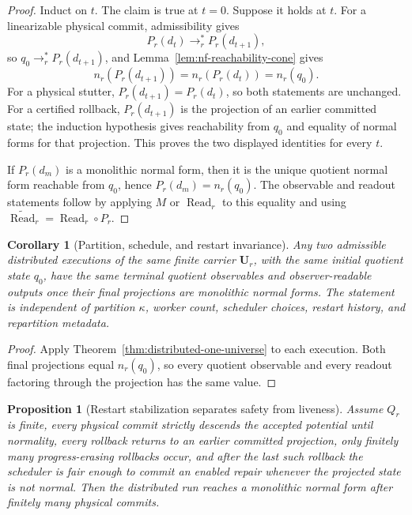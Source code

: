 \documentclass[11pt]{article}
\newtheorem{corollary}[theorem]{Corollary}
\newtheorem{proposition}[theorem]{Proposition}
\theoremstyle{remark}
\theoremstyle{plain}
\begin{document}
\begin{proof}
Induct on \(t\). The claim is true at \(t=0\). Suppose it holds at \(t\). For a linearizable
physical commit, admissibility gives
\[
P_r(d_t)\to_r^*P_r(d_{t+1}),
\]
so \(q_0\to_r^*P_r(d_{t+1})\), and Lemma~\ref{lem:nf-reachability-cone} gives
\[
n_r(P_r(d_{t+1}))=n_r(P_r(d_t))=n_r(q_0).
\]
For a physical stutter, \(P_r(d_{t+1})=P_r(d_t)\), so both statements are unchanged. For a
certified rollback, \(P_r(d_{t+1})\) is the projection of an earlier committed state; the
induction hypothesis gives reachability from \(q_0\) and equality of normal forms for
that projection. This proves the two displayed identities for every \(t\).

If \(P_r(d_m)\) is a monolithic normal form, then it is the unique quotient normal form reachable
from \(q_0\), hence \(P_r(d_m)=n_r(q_0)\). The observable and readout statements follow by applying
\(M\) or \(\operatorname{Read}_r\) to this equality and using
\(\widetilde{\operatorname{Read}}_r=\operatorname{Read}_r\circ P_r\).
\end{proof}

\begin{corollary}[Partition, schedule, and restart invariance]\label{cor:distributed-invariance}
Any two admissible distributed executions of the same finite carrier \(\mathbf U_r\), with the
same initial quotient state \(q_0\), have the same terminal quotient observables and
observer-readable outputs once their final projections are monolithic normal forms. The statement
is independent of partition \(\kappa\), worker count, scheduler choices, restart history, and
repartition metadata.
\end{corollary}

\begin{proof}
Apply Theorem~\ref{thm:distributed-one-universe} to each execution. Both final projections equal
\(n_r(q_0)\), so every quotient observable and every readout factoring through the projection has
the same value.
\end{proof}

\begin{proposition}[Restart stabilization separates safety from liveness]\label{prop:restart-stabilization}
Assume \(Q_r\) is finite, every physical commit strictly descends the accepted potential until
normality, every rollback returns to an earlier committed projection, only finitely many
progress-erasing rollbacks occur, and after the last such rollback the scheduler is fair enough
to commit an enabled repair whenever the projected state is not normal. Then the distributed run
reaches a monolithic normal form after finitely many physical commits.
\end{proposition}
\end{document}
